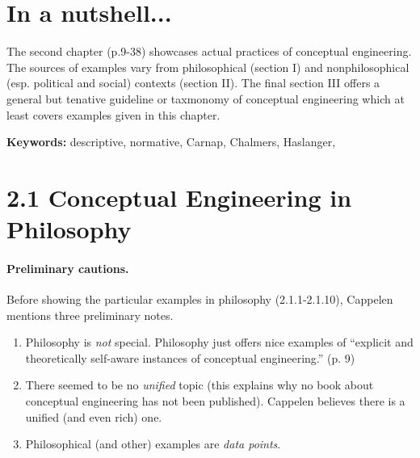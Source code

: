 \documentclass[
10pt, %
a4paper, %
twocolumn, %
landscape %
]{article}
\begin{document}
\pagestyle{myheadings} %
\markright{\doctitle} %


\thispagestyle{plain} %

\printtitle %


\section*{In a nutshell... }
The second chapter (p.9-38) showcases actual practices of conceptual engineering.
The sources of examples vary from philosophical (section I) and nonphilosophical (esp. political and social) contexts (section II).
The final section III offers a general but tenative guideline or taxmonomy of conceptual engineering which at least covers examples given in this chapter.

\noindent \textbf{Keywords:} descriptive, normative, Carnap, Chalmers, Haslanger,

\section*{2.1 Conceptual Engineering in Philosophy}
\paragraph{Preliminary cautions.}
Before showing the particular examples in philosophy (2.1.1-2.1.10), Cappelen mentions three preliminary notes.

\begin{enumerate}
  \item
    Philosophy is \emph{not} special. Philosophy just offers nice examples of ``explicit and theoretically self-aware instances of conceptual engineering.'' (p. 9)
  \item
    There seemed to be no \emph{unified} topic (this explains why no book about conceptual engineering has not been published). Cappelen believes there is a unified (and even rich) one.
  \item
    Philosophical (and other) examples are \emph{data points}.
\end{enumerate}
\end{document}
